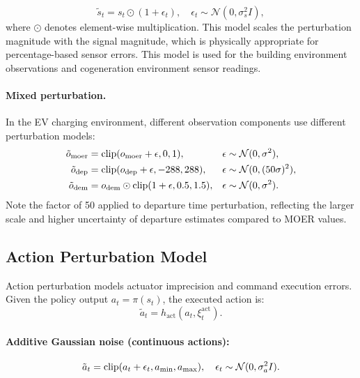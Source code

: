 \begin{definition}
\begin{equation}
    \tilde{s}_t = s_t \odot (1 + \epsilon_t), \quad \epsilon_t \sim \mathcal{N}(0, \sigma_s^2 I),
\end{equation}
where $\odot$ denotes element-wise multiplication. This model scales the perturbation magnitude with the signal magnitude, which is physically appropriate for percentage-based sensor errors. This model is used for the building environment observations and cogeneration environment sensor readings.
\end{definition}

\paragraph{Mixed perturbation.} In the EV charging environment, different observation components use different perturbation models:
\begin{align}
    \tilde{o}_{\text{moer}} &= \operatorname{clip}(o_{\text{moer}} + \epsilon, 0, 1), & \epsilon &\sim \mathcal{N}(0, \sigma^2), \\
    \tilde{o}_{\text{dep}} &= \operatorname{clip}(o_{\text{dep}} + \epsilon, -288, 288), & \epsilon &\sim \mathcal{N}(0, (50\sigma)^2), \\
    \tilde{o}_{\text{dem}} &= o_{\text{dem}} \odot \operatorname{clip}(1 + \epsilon, 0.5, 1.5), & \epsilon &\sim \mathcal{N}(0, \sigma^2).
\end{align}
Note the factor of 50 applied to departure time perturbation, reflecting the larger scale and higher uncertainty of departure estimates compared to MOER values.

\subsection{Action Perturbation Model}

Action perturbation models actuator imprecision and command execution errors. Given the policy output $a_t = \pi(s_t)$, the executed action is:
\begin{equation}
    \tilde{a}_t = h_{\text{act}}(a_t, \xi_t^{\text{act}}).
    \label{eq:act_noise}
\end{equation}

\paragraph{Additive Gaussian noise (continuous actions):}
\begin{equation}
    \tilde{a}_t = \operatorname{clip}(a_t + \epsilon_t, a_{\min}, a_{\max}), \quad \epsilon_t \sim \mathcal{N}(0, \sigma_a^2 I).
\end{equation}

